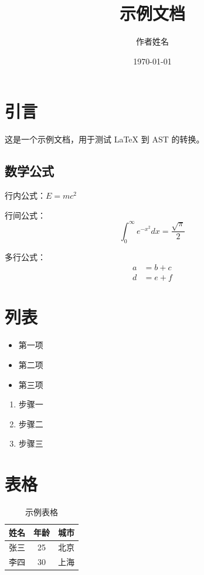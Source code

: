 \documentclass[12pt,a4paper]{article}
\title{示例文档}
\author{作者姓名}
\date{\today}
\begin{document}
\maketitle

\section{引言}

这是一个示例文档，用于测试 LaTeX 到 AST 的转换。

\subsection{数学公式}

行内公式：$E = mc^2$

行间公式：
\begin{equation}
    \int_{0}^{\infty} e^{-x^2} dx = \frac{\sqrt{\pi}}{2}
\end{equation}

多行公式：
\begin{align}
    a &= b + c \\
    d &= e + f
\end{align}

\section{列表}

\begin{itemize}
    \item 第一项
    \item 第二项
    \item 第三项
\end{itemize}

\begin{enumerate}
    \item 步骤一
    \item 步骤二
    \item 步骤三
\end{enumerate}

\section{表格}

\begin{table}[h]
    \centering
    \begin{tabular}{|c|c|c|}
        \hline
        姓名 & 年龄 & 城市 \\
        \hline
        张三 & 25 & 北京 \\
        李四 & 30 & 上海 \\
        \hline
    \end{tabular}
    \caption{示例表格}
    \label{tab:example}
\end{table}
\end{document}
